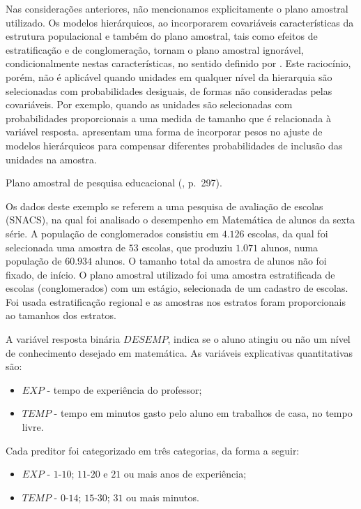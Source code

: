 \documentclass[]{book}
\numberwithin{example}{chapter}
\numberwithin{remark}{chapter}
\numberwithin{definition}{chapter}
\let\BeginKnitrBlock\begin \let\EndKnitrBlock\end
\begin{document}
Nas considerações anteriores, não mencionamos explicitamente o plano
amostral utilizado. Os modelos hierárquicos, ao incorporarem covariáveis
características da estrutura populacional e também do plano amostral,
tais como efeitos de estratificação e de conglomeração, tornam o plano
amostral ignorável, condicionalmente nestas características, no sentido
definido por \citep{Rubin76}. Este raciocínio, porém, não é aplicável
quando unidades em qualquer nível da hierarquia são selecionadas com
probabilidades desiguais, de formas não consideradas pelas covariáveis.
Por exemplo, quando as unidades são selecionadas com probabilidades
proporcionais a uma medida de tamanho que é relacionada à variável
resposta. \citep{Pfefetalli} apresentam uma forma de incorporar pesos no
ajuste de modelos hierárquicos para compensar diferentes probabilidades
de inclusão das unidades na amostra.

\BeginKnitrBlock{example}
\protect\hypertarget{ex:unnamed-chunk-137}{}{\label{ex:unnamed-chunk-137}}Plano
amostral de pesquisa educacional (\citep{lethonen}, p.~297).
\EndKnitrBlock{example} Os dados deste exemplo se referem a uma pesquisa
de avaliação de escolas (SNACS), na qual foi analisado o desempenho em
Matemática de alunos da sexta série. A população de conglomerados
consistiu em \(4.126\) escolas, da qual foi selecionada uma amostra de
\(53\) escolas, que produziu \(1.071\) alunos, numa população de
\(60.934\) alunos. O tamanho total da amostra de alunos não foi fixado,
de início. O plano amostral utilizado foi uma amostra estratificada de
escolas (conglomerados) com um estágio, selecionada de um cadastro de
escolas. Foi usada estratificação regional e as amostras nos estratos
foram proporcionais ao tamanhos dos estratos.

A variável resposta binária \(DESEMP\), indica se o aluno atingiu ou não
um nível de conhecimento desejado em matemática. As variáveis
explicativas quantitativas são:

\begin{itemize}
\item
  \(EXP\) - tempo de experiência do professor;
\item
  \(TEMP\) - tempo em minutos gasto pelo aluno em trabalhos de casa, no
  tempo livre.
\end{itemize}

Cada preditor foi categorizado em três categorias, da forma a seguir:

\begin{itemize}
\item
  \(EXP\) - \(1\)-\(10\); \(11\)-\(20\) e \(21\) ou mais anos de
  experiência;
\item
  \(TEMP\) - \(0\)-\(14\); \(15\)-\(30\); \(31\) ou mais minutos.
\end{itemize}
\end{document}
